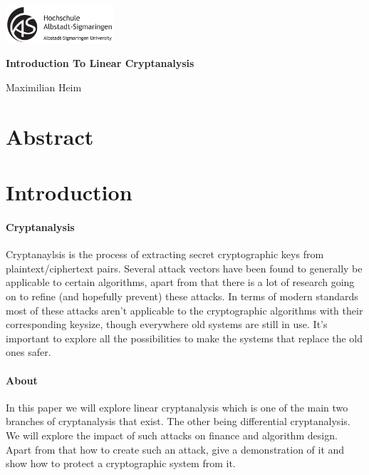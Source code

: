 \documentclass[11pt,a4paper]{article}
\begin{document}
\begin{titlepage}
    \begin{center}
        \includegraphics[width=0.3\textwidth]{logo.png}

        \vspace{20pt}

        \textbf{Introduction To Linear Cryptanalysis}

        \vspace{10pt}

        \small Maximilian Heim
    \end{center}
\end{titlepage}
\newpage
\tableofcontents
\newpage
\begin{multicols}{2}
\section{Abstract}
\section{Introduction}
\paragraph{Cryptanalysis}
Cryptanaylsis is the process of extracting secret cryptographic keys from plaintext/ciphertext pairs. Several attack vectors have been found to generally be applicable to certain algorithms, apart from that there is a lot of research going on to refine (and hopefully prevent) these attacks. In terms of modern standards most of these attacks aren't applicable to the cryptographic algorithms with their corresponding keysize, though everywhere old systems are still in use. It's important to explore all the possibilities to make the systems that replace the old ones safer.
\paragraph{About}
In this paper we will explore linear cryptanalysis which is one of the main two branches of cryptanalysis that exist. The other being differential cryptanalysis. We will explore the impact of such attacks on finance and algorithm design. Apart from that how to create such an attack, give a demonstration of it and show how to protect a cryptographic system from it.
\end{multicols}
\end{document}
